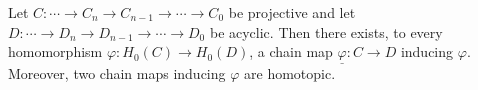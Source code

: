 Let $C : \cdots \to C_n \to C_{n-1} \to \cdots \to C_0$ be projective and let $D : \cdots \to D_n \to D_{n-1} \to \cdots \to D_0$ be acyclic. Then there exists, to every homomorphism $\varphi : H_0(C) \to H_0(D)$, a chain map $\underline{\varphi} : C \to D$ inducing $\varphi$. Moreover, two chain maps inducing $\varphi$ are homotopic.